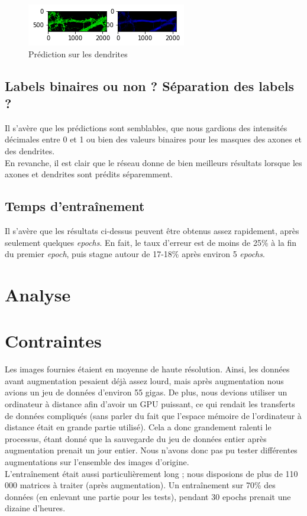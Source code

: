\documentclass{report}
\begin{document}
\begin{figure}[H]
\centering
\includegraphics[scale=0.8]{"397_result"}
\caption{Prédiction sur les dendrites}
\end{figure}

\section{Labels binaires ou non ? Séparation des labels ?}

Il s'avère que les prédictions sont semblables, que nous gardions des intensités
décimales entre 0 et 1 ou bien des valeurs binaires pour les masques des axones
et des dendrites. \\
En revanche, il est clair que le réseau donne de bien meilleurs résultats lorsque
les axones et dendrites sont prédits séparemment.

\section{Temps d'entraînement}

Il s'avère que les résultats ci-dessus peuvent être obtenus assez rapidement, après
seulement quelques \textit{epochs}. En fait, le taux d'erreur est de moins de 25\%
à la fin du premier \textit{epoch}, puis stagne autour de 17-18\% après environ 5
\textit{epochs}.


\chapter{Analyse}

\chapter{Contraintes}

Les images fournies étaient en moyenne de haute résolution. Ainsi, les données
avant augmentation pesaient déjà assez lourd, mais après augmentation nous
avions un jeu de données d'environ 55 gigas. De plus, nous devions utiliser un
ordinateur à distance afin d'avoir un GPU puissant, ce qui rendait les transferts
de données compliqués (sans parler du fait que l'espace mémoire de l'ordinateur
à distance était en grande partie utilisé). Cela a donc grandement ralenti le
processus, étant donné que la sauvegarde du jeu de données entier après augmentation
prenait un jour entier. Nous n'avons donc pas pu tester différentes augmentations
sur l'ensemble des images d'origine. \\
L'entraînement était aussi particulièrement long ; nous disposions de plus de
110 000 matrices à traiter (après augmentation). Un entraînement sur 70\% des
données (en enlevant une partie pour les tests), pendant 30 epochs prenait une
dizaine d'heures.
\end{document}
